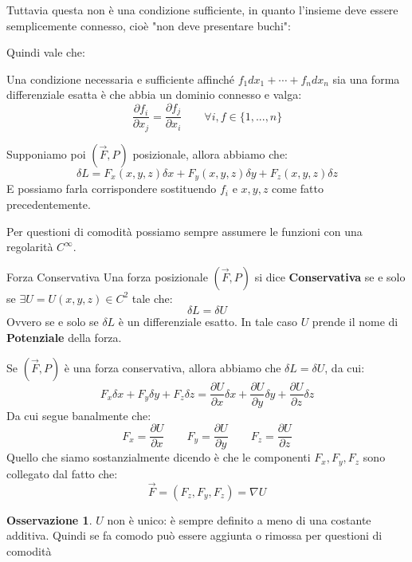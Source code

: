 \documentclass[11pt,a4paper,twoside]{article}
\theoremstyle{definition}
\newtheorem*{oss}{Osservazione}
\begin{document}
{	Tuttavia questa non è una condizione sufficiente, in quanto l'insieme deve essere semplicemente connesso, cioè "non deve presentare buchi":
	\begin{center}
	\end{center}
	Quindi vale che:
	\begin{prop}{}{}
		{Una condizione necessaria e sufficiente affinché $f_1dx_1 + \cdots + f_ndx_n$ sia una forma differenziale esatta è che abbia un dominio connesso e valga}:
	\[ \frac{\partial f_i}{\partial x_j} = \frac{\partial f_j}{\partial x_i}\qquad \forall i,f \in \{1,...,n\} \]
	\end{prop}
}

Supponiamo poi $(\vec F, P)$ posizionale, allora abbiamo che:
\[\delta L = F_x(x,y,z) \delta x + F_y(x,y,z)\delta y + F_z(x,y,z)\delta z\]
E possiamo farla corrispondere sostituendo $f_i$ e $x,y,z$ come fatto precedentemente.

Per questioni di comodità possiamo sempre assumere le funzioni con una regolarità $C^\infty$.
\begin{defn}{Forza Conservativa}{}
	Una forza posizionale $(\vec F, P)$ si dice \textbf{Conservativa} se e solo se $\exists U = U(x,y,z) \in C^2$ tale che:
	\[ \delta L = \delta U \]
	Ovvero se e solo se $\delta L$ è un differenziale esatto. In tale caso $U$ prende il nome di \textbf{Potenziale} della forza.
\end{defn}
Se $(\vec F, P)$ è una forza conservativa, allora abbiamo che $\delta L = \delta U$, da cui:
\[ F_x \delta x + F_y \delta y + F_z \delta z = \frac{\partial U}{\partial x}\delta x + \frac{\partial U}{\partial y}\delta y + \frac{\partial U}{\partial z}\delta z\]
Da cui segue banalmente che:
\[ F_x = \frac{\partial U}{\partial x}\qquad F_y = \frac{\partial U}{\partial y}\qquad F_z=\frac{\partial U}{\partial z} \]
Quello che siamo sostanzialmente dicendo è che le componenti $F_x, F_y, F_z$ sono collegato dal fatto che:
\[ \vec F = (F_z, F_y, F_z) = \nabla U \]

\begin{oss}
	$U$ non è unico: è sempre definito a meno di una costante additiva. Quindi se fa comodo può essere aggiunta o rimossa per questioni di comodità
\end{oss}
\end{document}
